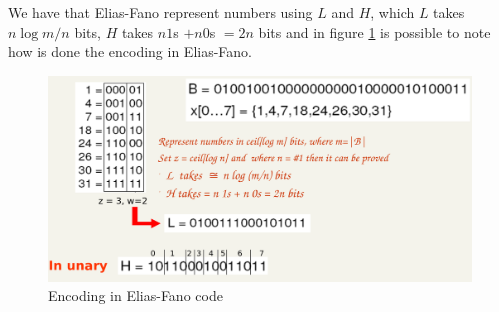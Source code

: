 We have that Elias-Fano represent numbers using $L$ and $H$, which
$L$ takes $n \log m/n$ bits, $H$ takes $n 1$s $ + n 0$s $ = 2n$ bits 
and in figure \ref{img:eliasFano} is possible to note how is done the 
encoding in Elias-Fano.

\begin{figure}
	\includegraphics[width=\textwidth]{Images/eliasFano}
	\caption{Encoding in Elias-Fano code}
	\label{img:eliasFano}
\end{figure}
